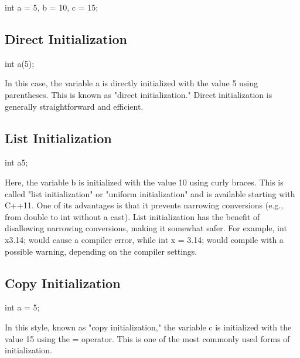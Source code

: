 \documentclass{report}
\begin{document}
    \begin{cppcode}
int a = 5, b = 10, c = 15;
    \end{cppcode}
    

    \bigbreak \noindent 
    \subsection{Direct Initialization}
    \bigbreak \noindent 
    
    \begin{cppcode}
int a(5);
    \end{cppcode}
    
    \bigbreak \noindent 
    In this case, the variable a is directly initialized with the value 5 using parentheses. This is known as "direct initialization." Direct initialization is generally straightforward and efficient.

    \bigbreak \noindent 
    \subsection{List Initialization}
    \bigbreak \noindent 
    
    \begin{cppcode}
int a{5};
    \end{cppcode}
    
    \bigbreak \noindent 
    Here, the variable b is initialized with the value 10 using curly braces. This is called "list initialization" or "uniform initialization" and is available starting with C++11. One of its advantages is that it prevents narrowing conversions (e.g., from double to int without a cast).
    \bigbreak \noindent 
    List initialization has the benefit of disallowing narrowing conversions, making it somewhat safer. For example, int x{3.14}; would cause a compiler error, while int x = 3.14; would compile with a possible warning, depending on the compiler settings.

    \bigbreak \noindent 
    \subsection{Copy Initialization}
    \bigbreak \noindent 
    
    \begin{cppcode}
int a = 5;
    \end{cppcode}
    
    \bigbreak \noindent 
    In this style, known as "copy initialization," the variable c is initialized with the value 15 using the = operator. This is one of the most commonly used forms of initialization.
\end{document}
